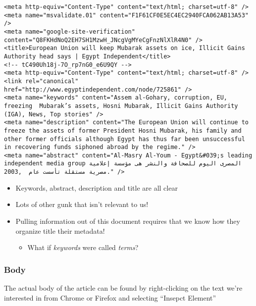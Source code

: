 \documentclass[11pt]{article}
\begin{document}
\begin{verbatim}
<meta http-equiv="Content-Type" content="text/html; charset=utf-8" />
<meta name="msvalidate.01" content="F1F61CF0E5EC4EC2940FCA062AB13A53" />
<meta name="google-site-verification" content="Q8FKHdNoQ2EH7SH1MzwH_JNcgVgMYeCgFnzNlXlR4N0" />
<title>European Union will keep Mubarak assets on ice, Illicit Gains Authority head says | Egypt Independent</title>
<!-- tC490Uh18j-7O_rp7nG0_e6U9QY -->
<meta http-equiv="Content-Type" content="text/html; charset=utf-8" />
<link rel="canonical" href="http://www.egyptindependent.com/node/725861" />
<meta name="keywords" content="Assem al-Gohary, corruption, EU, freezing  Mubarak’s assets, Hosni Mubarak, Illicit Gains Authority (IGA), News, Top stories" />
<meta name="description" content="The European Union will continue to freeze the assets of former President Hosni Mubarak, his family and other former officials although Egypt has thus far been unsuccessful in recovering funds siphoned abroad by the regime." />
<meta name="abstract" content="Al-Masry Al-Youm - Egypt&#039;s leading independent media group المصرى اليوم للصحافة والنشر هى مؤسسة إعلامية مصرية مستقلة تأسست عام  ,2003." />
\end{verbatim}
\begin{itemize}
\item Keywords, abstract, description and title are all clear
\item Lots of other gunk that isn't relevant to us!
\item Pulling information out of this document requires that we know how
    they organize title their metadata!
\begin{itemize}
\item What if \emph{keywords} were called \emph{terms}?
\end{itemize}
\end{itemize}
\subsubsection{Body}
\label{sec-4-1-2}

The actual body of the article can be found by right-clicking on the
  text we're interested in from Chrome or Firefox and selecting
  ``Insepct Element''
\end{document}
